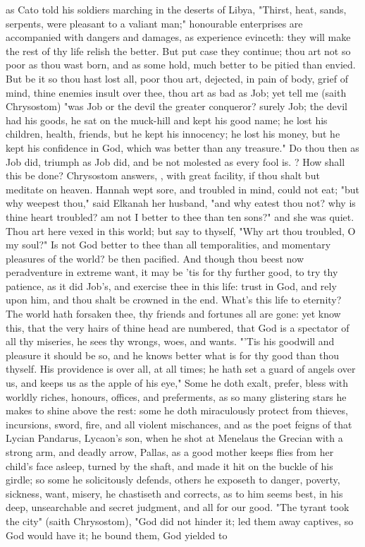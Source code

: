 {as Cato told his soldiers marching in the deserts of Libya, "Thirst, heat, sands, serpents, were pleasant to a valiant man;" honourable enterprises are accompanied with dangers and damages, as experience evinceth: they will make the rest of thy life relish the better. But put case they continue; thou art not so poor as thou wast born, and as some hold, much better to be pitied than envied. But be it so thou hast lost all, poor thou art, dejected, in pain of body, grief of mind, thine enemies insult over thee, thou art as bad as Job; yet tell me (saith Chrysostom) "was Job or the devil the greater conqueror? surely Job; the devil had his goods, he sat on the muck-hill and kept his good name; he lost his children, health, friends, but he kept his innocency; he lost his money, but he kept his confidence in God, which was better than any treasure." Do thou then as Job did, triumph as Job did, and be not molested as every fool is. ? How shall this be done? Chrysostom answers, , with great facility, if thou shalt but meditate on heaven. Hannah wept sore, and troubled in mind, could not eat; "but why weepest thou," said Elkanah her husband, "and why eatest thou not? why is thine heart troubled? am not I better to thee than ten sons?" and she was quiet. Thou art here vexed in this world; but say to thyself, "Why art thou troubled, O my soul?" Is not God better to thee than all temporalities, and momentary pleasures of the world? be then pacified. And though thou beest now peradventure in extreme want, it may be 'tis for thy further good, to try thy patience, as it did Job's, and exercise thee in this life: trust in God, and rely upon him, and thou shalt be crowned in the end. What's this life to eternity? The world hath forsaken thee, thy friends and fortunes all are gone: yet know this, that the very hairs of thine head are numbered, that God is a spectator of all thy miseries, he sees thy wrongs, woes, and wants. "'Tis his goodwill and pleasure it should be so, and he knows better what is for thy good than thou thyself. His providence is over all, at all times; he hath set a guard of angels over us, and keeps us as the apple of his eye,"  Some he doth exalt, prefer, bless with worldly riches, honours, offices, and preferments, as so many glistering stars he makes to shine above the rest: some he doth miraculously protect from thieves, incursions, sword, fire, and all violent mischances, and as the poet feigns of that Lycian Pandarus, Lycaon's son, when he shot at Menelaus the Grecian with a strong arm, and deadly arrow, Pallas, as a good mother keeps flies from her child's face asleep, turned by the shaft, and made it hit on the buckle of his girdle; so some he solicitously defends, others he exposeth to danger, poverty, sickness, want, misery, he chastiseth and corrects, as to him seems best, in his deep, unsearchable and secret judgment, and all for our good. "The tyrant took the city" (saith Chrysostom), "God did not hinder it; led them away captives, so God would have it; he bound them, God yielded to }
